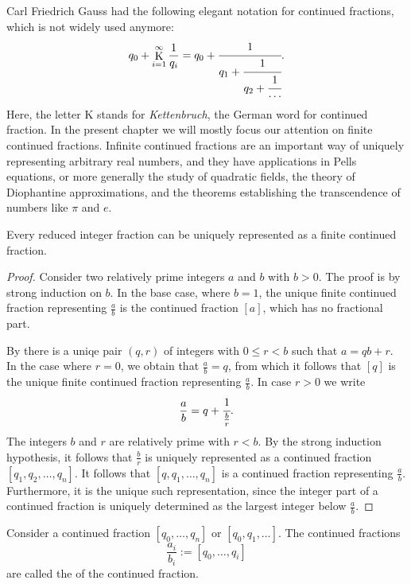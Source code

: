 Carl Friedrich Gauss had the following elegant notation for continued fractions, which is not widely used anymore:
\begin{equation*}
  q_0+\mathop{\mathrm{K}}\limits_{i=1}^{\infty} \frac{1}{q_i} =
  q_0+\cfrac{1}{q_1+\cfrac{1}{q_2+\cfrac{1}{\cdots}}}.
\end{equation*}
Here, the letter K stands for \emph{Kettenbruch}, the German word for continued fraction. In the present chapter we will mostly focus our attention on finite continued fractions. Infinite continued fractions are an important way of uniquely representing arbitrary real numbers, and they have applications in Pells equations, or more generally the study of quadratic fields, the theory of Diophantine approximations, and the theorems establishing the transcendence of numbers like $\pi$ and $e$.

\begin{theorem}
  Every reduced integer fraction can be uniquely represented as a finite continued fraction.
\end{theorem}

\begin{proof}
  Consider two relatively prime integers $a$ and $b$ with $b>0$. The proof is by strong induction on $b$. In the base case, where $b=1$, the unique finite continued fraction representing $\frac{a}{b}$ is the continued fraction $[a]$, which has no fractional part. 

  By  there is a uniqe pair $(q,r)$ of integers with $0\leq r<b$ such that $a=qb+r$. In the case where $r=0$, we obtain that $\frac{a}{b}=q$, from which it follows that $[q]$ is the unique finite continued fraction representing $\frac{a}{b}$. In case $r>0$ we write
  \begin{equation*}
    \frac{a}{b} = q + \cfrac{1}{\frac{b}{r}}.
  \end{equation*}
  The integers $b$ and $r$ are relatively prime with $r<b$. By the strong induction hypothesis, it follows that $\frac{b}{r}$ is uniquely represented as a continued fraction $[q_1,q_2,\ldots,q_n]$. It follows that $[q,q_1,\ldots,q_n]$ is a continued fraction representing $\frac{a}{b}$. Furthermore, it is the unique such representation, since the integer part of a continued fraction is uniquely determined as the largest integer below $\frac{a}{b}$.
\end{proof}

\begin{definition}
  Consider a continued fraction $[q_0,\ldots,q_n]$ or $[q_0,q_1,\ldots]$. The continued fractions
  \begin{equation*}
    \frac{a_i}{b_i}:=[q_0,\ldots,q_i]
  \end{equation*}
  are called the  of the continued fraction.
\end{definition}

